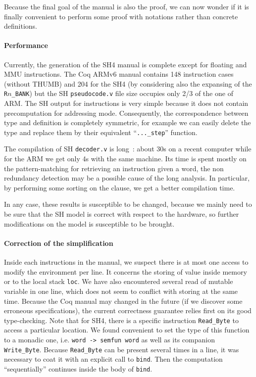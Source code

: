 \documentclass[a4paper, 11pt]{article}
\begin{document}
Because the final goal of the manual is also the proof, we can now wonder if it is finally convenient to perform some proof with notations rather than concrete definitions.

\paragraph{Performance}
Currently, the generation of the SH4 manual is complete except for floating and MMU instructions. The Coq ARMv6 manual contains 148 instruction cases (without THUMB) and 204 for the SH4 (by considering also the expansing of the \verb|R|$n$\verb|_BANK|) but the SH {\tt pseudocode.v} file size occupies only 2/3 of the one of ARM. The SH output for instructions is very simple because it does not contain precomputation for addressing mode. Consequently, the correspondence between type and definition is completely symmetric, for example we can easily delete the type and replace them by their equivalent ``\verb|..._step|'' function.

The compilation of SH {\tt decoder.v} is long~: about 30s on a recent computer while for the ARM we get only 4s with the same machine. Its time is spent mostly on the pattern-matching for retrieving an instruction given a word, the non redundancy detection may be a possible cause of the long analysis. In particular, by performing some sorting on the clause, we get a better compilation time.

\hspace{1ex}

In any case, these results is susceptible to be changed, because we mainly need to be sure that the SH model is correct with respect to the hardware, so further modifications on the model is susceptible to be brought.

\paragraph{Correction of the simplification}
Inside each instructions in the manual, we suspect there is at most one access to modify the environment per line. It concerns the storing of value inside memory or to the local stack \verb|loc|. We have also encountered several read of mutable variable in one line, which does not seem to conflict with storing at the same time. Because the Coq manual may changed in the future (if we discover some erroneous specifications), the current correctness guarantee relies first on its good type-checking.
Note that for SH4, there is a specific instruction \verb|Read_Byte| to access a particular location. We found convenient to set the type of this function to a monadic one, i.e. \verb|word -> semfun word| as well as its companion \verb|Write_Byte|. Because \verb|Read_Byte| can be present several times in a line, it was necessary to coat it with an explicit call to \verb|bind|. Then the computation ``sequentially'' continues inside the body of \verb|bind|.
\end{document}
